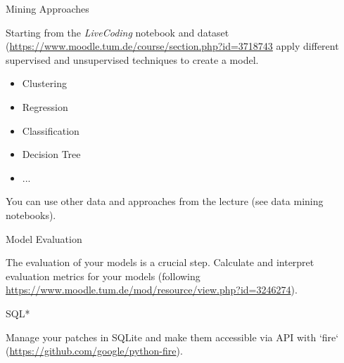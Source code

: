\documentclass[twoside]{article}
\begin{document}
\maketitle

\vspace{10pt}



\begin{task}{Mining Approaches}{}{}

Starting from the \textit{LiveCoding} notebook and dataset (\url{https://www.moodle.tum.de/course/section.php?id=3718743} apply different supervised and unsupervised techniques to create a model.

\begin{itemize}
    \item Clustering
    \item Regression
    \item Classification
    \item Decision Tree
    \item ...
\end{itemize}
\vspace{10pt}


You can use other data and approaches from the lecture (see data mining notebooks).


\end{task}

\begin{task}{Model Evaluation}{}{}

The evaluation of your models is a crucial step. Calculate and interpret evaluation metrics for your models (following \url{https://www.moodle.tum.de/mod/resource/view.php?id=3246274}).


\end{task}

\begin{task}{SQL*}{}{}

Manage your patches in SQLite and make them accessible via API with `fire` (\url{https://github.com/google/python-fire}).


\end{task}
\end{document}
